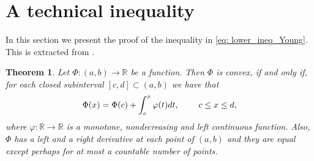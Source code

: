 \documentclass{article}
\newtheorem{theorem}{Theorem}[section]
\theoremstyle{definition}
\begin{document}
\section{A technical inequality}\label{sec: inequality}

In this section we present the proof of the inequality in \eqref{eq: lower_ineq_Young}. This is extracted from \cite{Rao1991TheoryOO}.

\begin{theorem}
Let $\Phi:(a,b)\to \mathbb{R}$ be a function. Then $\Phi$ is convex, if and only if, for each closed subinterval $[c,d]\subset (a,b)$ we have that 
\begin{equation}\label{eq: integral_theorem}
\Phi(x)=\Phi(c)+\int_c^x\varphi(t)dt,\hspace{8mm} c\leq x\leq d,
\end{equation}
where $\varphi:\mathbb{R}\to\mathbb{R} $ is a monotone, nondecreasing and left continuous function. Also, $\Phi$ has a left and a right derivative at each point of $(a, b)$ and they are equal except perhaps for at most a countable number of points.
\end{theorem}
\end{document}
